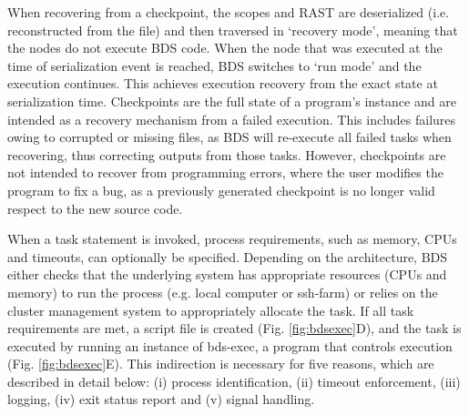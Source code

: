 When recovering from a checkpoint, the scopes and RAST are deserialized (i.e. reconstructed from the file) and then traversed in ‘recovery mode’, meaning that the nodes do not execute BDS code. When the node that was executed at the time of serialization event is reached, BDS switches to ‘run mode’ and the execution continues. This achieves execution recovery from the exact state at serialization time. Checkpoints are the full state of a program’s instance and are intended as a recovery mechanism from a failed execution. This includes failures owing to corrupted or missing files, as BDS will re-execute all failed tasks when recovering, thus correcting outputs from those tasks. However, checkpoints are not intended to recover from programming errors, where the user modifies the program to fix a bug, as a previously generated checkpoint is no longer valid respect to the new source code.

When a task statement is invoked, process requirements, such as memory, CPUs and timeouts, can optionally be specified. Depending on the architecture, BDS either checks that the underlying system has appropriate resources (CPUs and memory) to run the process (e.g. local computer or ssh-farm) or relies on the cluster management system to appropriately allocate the task. If all task requirements are met, a script file is created (Fig. \ref{fig:bdsexec}D), and the task is executed by running an instance of bds-exec, a program that controls execution (Fig. \ref{fig:bdsexec}E). This indirection is necessary for five reasons, which are described in detail below: (i) process identification, (ii) timeout enforcement, (iii) logging, (iv) exit status report and (v) signal handling.

